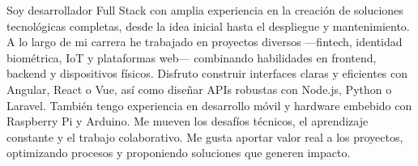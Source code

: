 %
%
%
\par{
Soy desarrollador Full Stack con amplia experiencia en la creación de soluciones tecnológicas completas, desde la idea inicial hasta el despliegue y mantenimiento. A lo largo de mi carrera he trabajado en proyectos diversos —fintech, identidad biométrica, IoT y plataformas web— combinando habilidades en frontend, backend y dispositivos físicos. Disfruto construir interfaces claras y eficientes con Angular, React o Vue, así como diseñar APIs robustas con Node.js, Python o Laravel. También tengo experiencia en desarrollo móvil y hardware embebido con Raspberry Pi y Arduino. Me mueven los desafíos técnicos, el aprendizaje constante y el trabajo colaborativo. Me gusta aportar valor real a los proyectos, optimizando procesos y proponiendo soluciones que generen impacto.
}